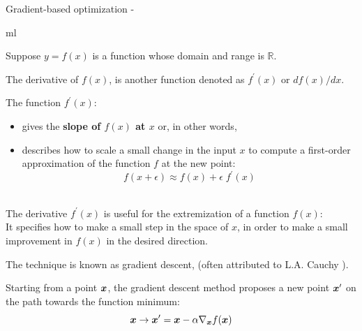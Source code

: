 
\begin{frame}[t,allowframebreaks]{Gradient-based optimization -}


    \gls{ml}

    \framebreak


    Suppose $y=f(x)$ is a function whose domain and range is $\mathbb{R}$.\\
    \vspace{0.2cm}

    The \gls{derivative} of $f(x)$, is another function 
    denoted as $f^\prime(x)$ or $df(x)/dx$.\\
    \vspace{0.2cm}
    
    The function $f^\prime(x)$:
    \begin{itemize}
        \item
        gives the {\bf slope of $f(x)$ at $x$} or, in other words,
        \item
        describes how to         
        scale a small change in the input $x$
        to compute a first-order approximation of the function $f$ at the new point:
        \begin{equation}
          f(x+\epsilon) \approx f(x) + \epsilon \; f^\prime(x)  
          \label{eq:deriv_1}
       \end{equation}\\
    \end{itemize}

    The \gls{derivative} $f^\prime(x)$ is useful for the 
    \gls{extremization} of a function $f(x)$:\\
    It specifies how to make a small step in the space of $x$, 
    in order to make a small improvement in $f(x)$ in the desired direction.\\
    \vspace{0.2cm}

    The technique is known as \gls{gradient descent},
    (often attributed to L.A. Cauchy 
    \cite{Cauchy:GradientDescent}).

    Starting from a point $\boldsymbol{x}$, 
    the \gls{gradient descent} method 
    proposes a new point $\boldsymbol{x}^\prime$ 
    on the path towards the function minimum:
    \begin{equation}
        \boldsymbol{x} \rightarrow \boldsymbol{x}^\prime = 
          \boldsymbol{x} - \alpha \nabla_{\boldsymbol{x}} f(\boldsymbol{x})
        \label{eq:grad_descent_1}
     \end{equation}\\


\end{frame}
